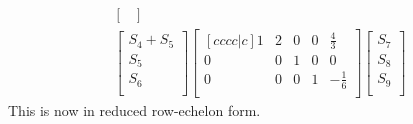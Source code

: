 \documentclass{report}
\begin{document}
\begin{align*}
\begin{bmatrix}
\end{bmatrix}\\
\begin{bmatrix}
S_4 + S_5\\
S_5\\
S_6\\
\end{bmatrix}
\begin{bmatrix}[cccc|c]
1 & 2 & 0 & 0 & \frac{4}{3}\\
0 & 0 & 1 & 0 & 0\\
0 & 0 & 0 & 1 & -\frac{1}{6}\\
\end{bmatrix}
\begin{bmatrix}
S_7\\
S_8\\
S_9\\
\end{bmatrix}
\end{align*}
This is now in reduced row-echelon form.\\
\\
\end{document}
